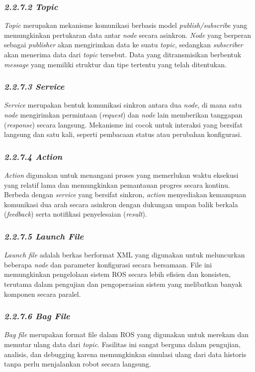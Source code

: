 \subsubsection{\emph{2.2.7.2 Topic}}
\emph{Topic} merupakan mekanisme komunikasi berbasis model \emph{publish/subscribe} yang memungkinkan pertukaran data antar \emph{node} secara asinkron. \emph{Node} yang berperan sebagai \emph{publisher} akan mengirimkan data ke suatu \emph{topic}, sedangkan \emph{subscriber} akan menerima data dari \emph{topic} tersebut. Data yang ditransmisikan berbentuk \emph{message} yang memiliki struktur dan tipe tertentu yang telah ditentukan.

\subsubsection{\emph{2.2.7.3 Service}}
\emph{Service} merupakan bentuk komunikasi sinkron antara dua \emph{node}, di mana satu \emph{node} mengirimkan permintaan (\emph{request}) dan \emph{node} lain memberikan tanggapan (\emph{response}) secara langsung. Mekanisme ini cocok untuk interaksi yang bersifat langsung dan satu kali, seperti pembacaan status atau perubahan konfigurasi.

\subsubsection{\emph{2.2.7.4 Action}}
\emph{Action} digunakan untuk menangani proses yang memerlukan waktu eksekusi yang relatif lama dan memungkinkan pemantauan progres secara kontinu. Berbeda dengan \emph{service} yang bersifat sinkron, \emph{action} menyediakan kemampuan komunikasi dua arah secara asinkron dengan dukungan umpan balik berkala (\emph{feedback}) serta notifikasi penyelesaian (\emph{result}).

\subsubsection{\emph{2.2.7.5 Launch File}}
\emph{Launch file} adalah berkas berformat XML yang digunakan untuk meluncurkan beberapa \emph{node} dan parameter konfigurasi secara bersamaan. File ini memungkinkan pengelolaan sistem ROS secara lebih efisien dan konsisten, terutama dalam pengujian dan pengoperasian sistem yang melibatkan banyak komponen secara paralel.

\subsubsection{\emph{2.2.7.6 Bag File}}
\emph{Bag file} merupakan format file dalam ROS yang digunakan untuk merekam dan memutar ulang data dari \emph{topic}. Fasilitas ini sangat berguna dalam pengujian, analisis, dan debugging karena memungkinkan simulasi ulang dari data historis tanpa perlu menjalankan robot secara langsung.

